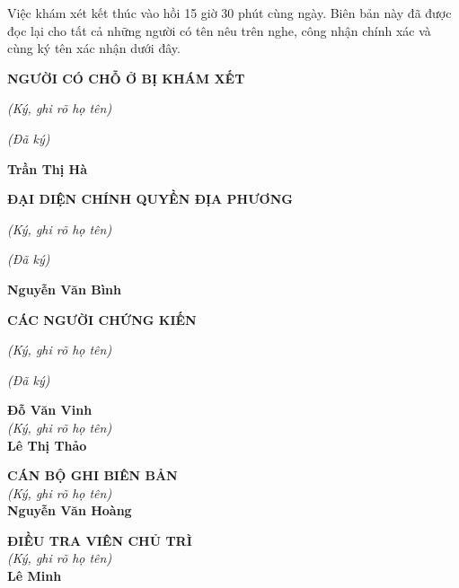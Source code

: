 \documentclass[12pt,a4paper]{article}
\begin{document}
Việc khám xét kết thúc vào hồi 15 giờ 30 phút cùng ngày. Biên bản này đã được đọc lại cho tất cả những người có tên nêu trên nghe, công nhận chính xác và cùng ký tên xác nhận dưới đây.



\textbf{NGƯỜI CÓ CHỖ Ở BỊ KHÁM XẾT}

\textit{(Ký, ghi rõ họ tên)}


\textit{(Đã ký)}

\textbf{Trần Thị Hà}


\textbf{ĐẠI DIỆN CHÍNH QUYỀN ĐỊA PHƯƠNG}

\textit{(Ký, ghi rõ họ tên)}


\textit{(Đã ký)}

\textbf{Nguyễn Văn Bình}


\textbf{CÁC NGƯỜI CHỨNG KIẾN}

\textit{(Ký, ghi rõ họ tên)}


\textit{(Đã ký)}

\vspace{0.8cm}
\noindent
\begin{minipage}[t]{0.48\textwidth}
    \begin{center}
        \textbf{Đỗ Văn Vinh}\\[0.1cm]
        \textit{(Ký, ghi rõ họ tên)}\\[1.4cm]
        \textbf{Lê Thị Thảo}
    \end{center}
\end{minipage}
\hfill
\begin{minipage}[t]{0.48\textwidth}
    \begin{center}
        \textbf{CÁN BỘ GHI BIÊN BẢN}\\[0.1cm]
        \textit{(Ký, ghi rõ họ tên)}\\[1.4cm]
        \textbf{Nguyễn Văn Hoàng}
    \end{center}
\end{minipage}
\vspace{0.6cm}
\noindent
\hfill
\begin{minipage}[t]{0.50\textwidth}
    \begin{center}
        \textbf{ĐIỀU TRA VIÊN CHỦ TRÌ}\\[0.1cm]
        \textit{(Ký, ghi rõ họ tên)}\\[1.4cm]
        \textbf{Lê Minh}
    \end{center}
\end{minipage}
\end{document}
